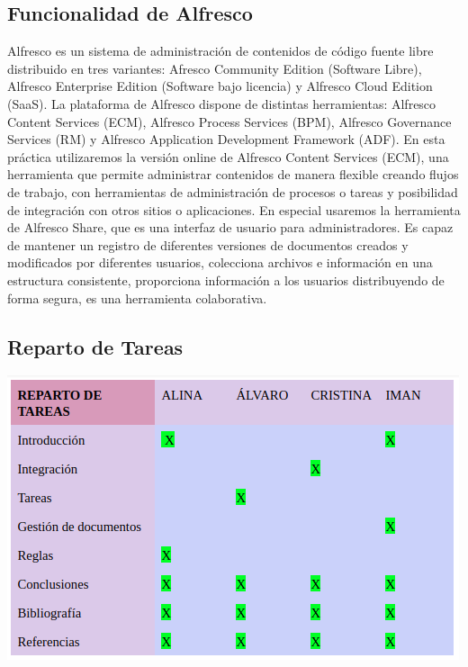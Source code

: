 \documentclass{article}
\begin{document}
\subsection{Funcionalidad de Alfresco}

Alfresco es un sistema de administración de contenidos de código fuente libre distribuido en tres variantes: Afresco Community Edition (Software Libre), Alfresco Enterprise Edition (Software bajo licencia) y Alfresco Cloud Edition (SaaS). La plataforma de Alfresco dispone de distintas herramientas: Alfresco Content Services (ECM), Alfresco Process Services (BPM), Alfresco Governance Services (RM) y Alfresco Application Development Framework (ADF). En esta práctica utilizaremos la versión online de Alfresco Content Services (ECM), una herramienta que permite administrar contenidos de manera flexible creando flujos de trabajo, con herramientas de administración de procesos o tareas y posibilidad de integración con otros sitios o aplicaciones. En especial usaremos la herramienta de Alfresco Share, que es una interfaz de usuario para administradores. Es capaz de mantener un registro de diferentes versiones de documentos creados y modificados por diferentes usuarios, colecciona archivos e información en una estructura consistente, proporciona información a los usuarios distribuyendo de forma segura, es una herramienta colaborativa. 


\subsection{Reparto de Tareas}

\begin{center}
\includegraphics[scale=0.6]{images/tareas.png}
\end{center}
\end{document}
